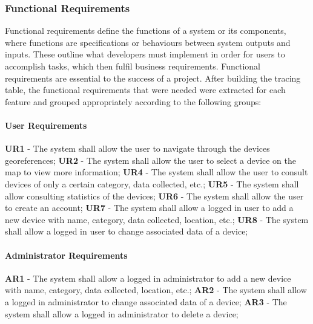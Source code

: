 \subsubsection{Functional Requirements}

Functional requirements \cite{fulton2017chapter} define the functions of a system or its components,
where functions are specifications or behaviours between system outputs and
inputs. These outline what developers must implement in order for users to
accomplish tasks, which then fulfil business requirements. Functional requirements are
essential to the success of a project.
After building the tracing table, the functional requirements that were needed
were extracted for each feature and grouped appropriately according to the
following groups:

\paragraph{User Requirements}

\textbf{UR1} - The system shall allow the user to navigate through the devices georeferences;
\newline
\textbf{UR2} - The system shall allow the user to select a device on the map to view more information;
\newline
\textbf{UR4} - The system shall allow the user to consult devices of only a certain category, data collected, etc.;
\newline
\textbf{UR5} - The system shall allow consulting statistics of the devices;
\newline
\textbf{UR6} - The system shall allow the user to create an account;
\newline
\textbf{UR7} - The system shall allow a logged in user to add a new device with name, category, data collected, location, etc.;
\newline
\textbf{UR8} - The system shall allow a logged in user to change associated data of a device;

\paragraph{Administrator Requirements}

\textbf{AR1} - The system shall allow a logged in administrator to add a new device with name, category, data collected, location, etc.;
\newline
\textbf{AR2} - The system shall allow a logged in administrator to change associated data of a device;
\newline
\textbf{AR3} - The system shall allow a logged in administrator to delete a device;

